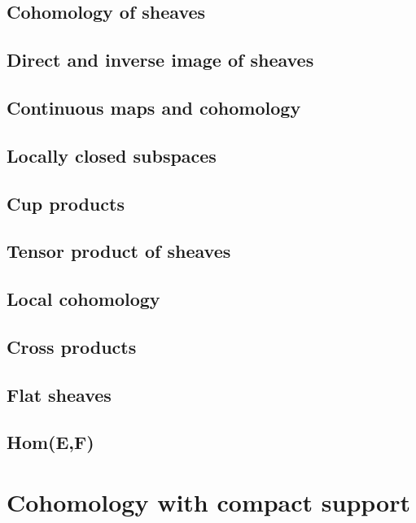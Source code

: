 \documentclass[5pt]{article}
\theoremstyle{definition}
\theoremstyle{remark}
\begin{document}
	\subsection{Cohomology of sheaves}
	
	\subsection{Direct and inverse image of sheaves}
	
	\subsection{Continuous maps and cohomology}
	
	\subsection{Locally closed subspaces}
	
	\subsection{Cup products}
	
	\subsection{Tensor product of sheaves}
	
	\subsection{Local cohomology}
	
	\subsection{Cross products}
	
	\subsection{Flat sheaves}
	
	\subsection{Hom(E,F)}
	
	\newpage
	
	\section{Cohomology with compact support}
	
\end{document}
